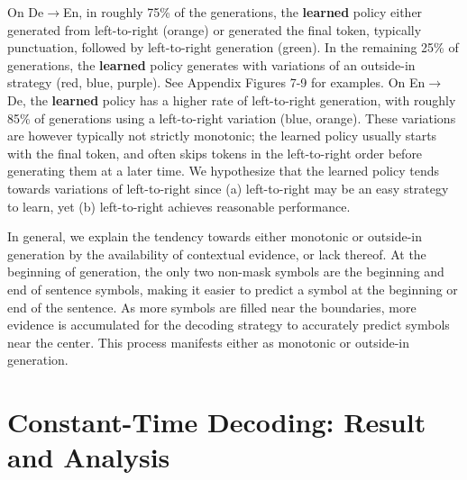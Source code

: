 \documentclass{article}
\newcommand{\alert}[1]{\textcolor{red}{TODO: #1}}
\begin{document}
On De$\to$En, in roughly 75\% of the generations, the \textbf{learned} policy either generated from left-to-right ({\color{orange}orange}) or generated the final token, typically punctuation, followed by left-to-right generation ({\color{green}green}). 
In the remaining 25\% of generations, the \textbf{learned} policy generates with variations of an outside-in strategy ({\color{red}red}, {\color{blue}blue}, {\color{purple}purple}).
See Appendix Figures 7-9 for examples.
On En$\to$De, the \textbf{learned} policy has a higher rate of left-to-right generation, with roughly 85\% of generations using a left-to-right variation ({\color{blue}blue}, {\color{orange}orange}). 
These variations are however typically not strictly monotonic; the learned policy usually starts with the final token, and often skips tokens in the left-to-right order before generating them at a later time.
We hypothesize that the learned policy tends towards variations of left-to-right since (a) left-to-right may be an easy strategy to learn, yet (b) left-to-right achieves reasonable performance.

In general, we explain the tendency towards either monotonic or outside-in generation
by the availability of contextual evidence, or lack thereof. At the beginning of generation, the only two non-mask symbols are the beginning and end of sentence symbols, making it easier to predict a symbol at the beginning or end of the sentence. As more symbols are filled near the boundaries, more evidence is accumulated for the decoding strategy to accurately predict symbols near the center. This process manifests either as monotonic or outside-in generation.

\section{Constant-Time Decoding: Result and Analysis}
\end{document}
